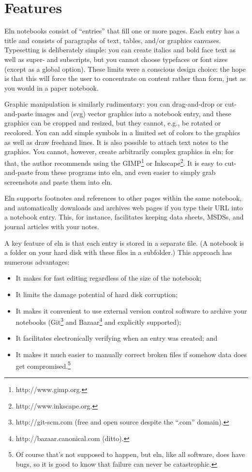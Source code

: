 \documentclass[11pt]{report}
\begin{document}
\section{Features}

Eln notebooks consist of ``entries'' that fill one or more pages.
Each entry has a title and consists of paragraphs of text, tables, and/or
graphics canvases. Typesetting is deliberately simple: you can create italics
and bold face text as well as super- and subscripts, but you cannot
choose typefaces or font sizes (except as a global option). These
limits were a conscious design choice: the hope is that this will
force the user to concentrate on content rather than form, just as you
would in a paper notebook.

Graphic manipulation is similarly rudimentary: you can drag-and-drop
or cut-and-paste images and (svg) vector graphics into a notebook
entry, and these graphics can be cropped and resized, but they cannot,
e.g., be rotated or recolored. You can add simple symbols in a limited
set of colors to the graphics as well as draw freehand lines. It is also
possible to attach text notes to the graphics. You cannot, however,
create arbitrarily complex graphics in eln; for that, the author
recommends using the GIMP\footnote{http://www.gimp.org.} or
Inkscape\footnote{http://www.inkscape.org.}. It is easy to
cut-and-paste from these programs into eln, and even easier to simply
grab screenshots and paste them into eln.

Eln supports footnotes and references to other pages within the same
notebook, and automatically downloads and archives web pages if you
type their URL into a notebook entry. This, for instance, facilitates
keeping data sheets, MSDSs, and journal articles with your notes.

A key feature of eln is that each entry is stored in a separate
file. (A notebook is a folder on your hard disk with these files in a
subfolder.) This approach has numerous advantages:
\begin{itemize}
  \item It makes for fast
editing regardless of the size of the notebook;
\item It limits the damage
potential of hard disk corruption;
\item It makes it convenient to use
external version control software to archive your notebooks
(Git\footnote{http://git-scm.com (free and open source despite the
  ``.com'' domain).} and Bazaar\footnote{http://bazaar.canonical.com (ditto).} and
explicitly supported);
\item It facilitates electronically verifying when an
entry was created; and
\item It makes it much easier to manually correct
broken files if somehow data does get compromised.\footnote{Of course
  that's not supposed to happen, but eln, like all software, does have
  bugs, so it is good to know that failure can never be catastrophic.}
\end{itemize}
\end{document}
